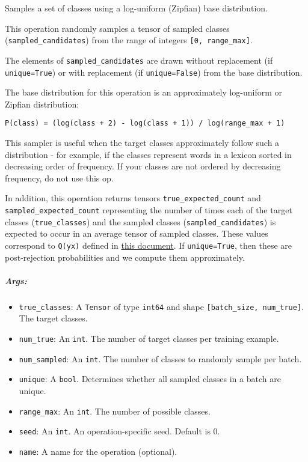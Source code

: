 Samples a set of classes using a log-uniform (Zipfian) base
distribution.

This operation randomly samples a tensor of sampled classes
(\texttt{sampled\_candidates}) from the range of integers
\texttt{{[}0,\ range\_max{]}}.

The elements of \texttt{sampled\_candidates} are drawn without
replacement (if \texttt{unique=True}) or with replacement (if
\texttt{unique=False}) from the base distribution.

The base distribution for this operation is an approximately log-uniform
or Zipfian distribution:

\texttt{P(class)\ =\ (log(class\ +\ 2)\ -\ log(class\ +\ 1))\ /\ log(range\_max\ +\ 1)}

This sampler is useful when the target classes approximately follow such
a distribution - for example, if the classes represent words in a
lexicon sorted in decreasing order of frequency. If your classes are not
ordered by decreasing frequency, do not use this op.

In addition, this operation returns tensors
\texttt{true\_expected\_count} and \texttt{sampled\_expected\_count}
representing the number of times each of the target classes
(\texttt{true\_classes}) and the sampled classes
(\texttt{sampled\_candidates}) is expected to occur in an average tensor
of sampled classes. These values correspond to \texttt{Q(y\textbar{}x)}
defined in
\href{http://www.tensorflow.org/extras/candidate_sampling.pdf}{this
document}. If \texttt{unique=True}, then these are post-rejection
probabilities and we compute them approximately.

\subparagraph{Args: }\label{args-26}

\begin{itemize}
\tightlist
\item
  \texttt{true\_classes}: A \texttt{Tensor} of type \texttt{int64} and
  shape \texttt{{[}batch\_size,\ num\_true{]}}. The target classes.
\item
  \texttt{num\_true}: An \texttt{int}. The number of target classes per
  training example.
\item
  \texttt{num\_sampled}: An \texttt{int}. The number of classes to
  randomly sample per batch.
\item
  \texttt{unique}: A \texttt{bool}. Determines whether all sampled
  classes in a batch are unique.
\item
  \texttt{range\_max}: An \texttt{int}. The number of possible classes.
\item
  \texttt{seed}: An \texttt{int}. An operation-specific seed. Default is
  0.
\item
  \texttt{name}: A name for the operation (optional).
\end{itemize}

